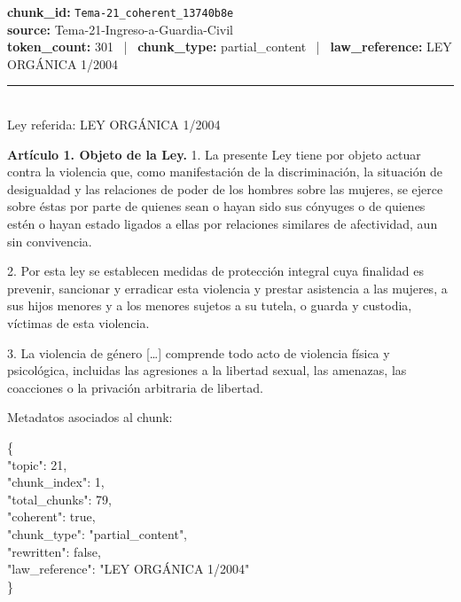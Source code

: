 \documentclass[10pt,twocolumn,letterpaper]{article}
\begin{document}
\begin{tcolorbox}[colback=agentZ!3, colframe=agentZ, title={\small Chunk real --- Art\'iculo 1 (L.O. 1/2004)},
  fonttitle=\bfseries\small, boxrule=0.5pt, arc=3pt, breakable]
{\scriptsize
\textbf{chunk\_id:} \texttt{Tema-21\_coherent\_13740b8e}\\
\textbf{source:} Tema-21-Ingreso-a-Guardia-Civil\\
\textbf{token\_count:} 301 ~|~ \textbf{chunk\_type:} partial\_content ~|~ \textbf{law\_reference:} LEY ORG\'ANICA 1/2004\\[4pt]
\rule{\linewidth}{0.3pt}\\[2pt]
Ley referida: LEY ORG\'ANICA 1/2004

\textbf{Art\'iculo 1. Objeto de la Ley.}
1. La presente Ley tiene por objeto actuar contra la violencia que, como manifestaci\'on
de la discriminaci\'on, la situaci\'on de desigualdad y las relaciones de poder de los
hombres sobre las mujeres, se ejerce sobre \'estas por parte de quienes sean o hayan
sido sus c\'onyuges o de quienes est\'en o hayan estado ligados a ellas por relaciones
similares de afectividad, aun sin convivencia.

2. Por esta ley se establecen medidas de protecci\'on integral cuya finalidad es prevenir,
sancionar y erradicar esta violencia y prestar asistencia a las mujeres, a sus hijos
menores y a los menores sujetos a su tutela, o guarda y custodia, v\'ictimas de esta violencia.

3. La violencia de g\'enero [\ldots] comprende todo acto de violencia f\'isica y psicol\'ogica,
incluidas las agresiones a la libertad sexual, las amenazas, las coacciones o la privaci\'on
arbitraria de libertad.
}
\end{tcolorbox}

Metadatos asociados al chunk:

\begin{tcolorbox}[colback=bglight, colframe=bordercolor, boxrule=0.5pt, arc=2pt]
{\scriptsize\ttfamily
\{\\
\hspace*{1em}"topic": 21,\\
\hspace*{1em}"chunk\_index": 1,\\
\hspace*{1em}"total\_chunks": 79,\\
\hspace*{1em}"coherent": true,\\
\hspace*{1em}"chunk\_type": "partial\_content",\\
\hspace*{1em}"rewritten": false,\\
\hspace*{1em}"law\_reference": "LEY ORG\'ANICA 1/2004"\\
\}
}
\end{tcolorbox}
\end{document}
